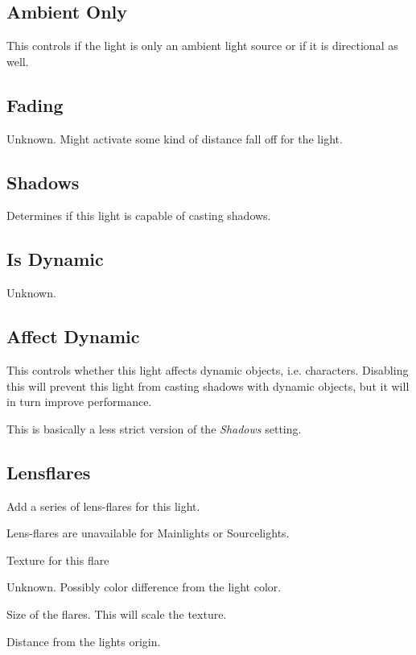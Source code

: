 \subsection*{Ambient Only}
This controls if the light is only an ambient light source or
if it is directional as well.

\subsection*{Fading}
Unknown. Might activate some kind of distance fall off for the light.

\subsection*{Shadows}
Determines if this light is capable of casting shadows.

\subsection*{Is Dynamic}
Unknown.

\subsection*{Affect Dynamic}
This controls whether this light affects dynamic objects, i.e. characters.
Disabling this will prevent this light from casting shadows with dynamic
objects, but it will in turn improve performance.

This is basically a less strict version of the \textit{Shadows} setting.

\subsection*{Lensflares}
Add a series of lens-flares for this light.

Lens-flares are unavailable for Mainlights or Sourcelights.
\begin{description}[leftmargin=6em,style=nextline]
    \item[Texture] Texture for this flare
    \item[Colorshift] Unknown. Possibly color difference from the light color.
    \item[Size] Size of the flares. This will scale the texture.
    \item[Position] Distance from the lights origin.
\end{description}

